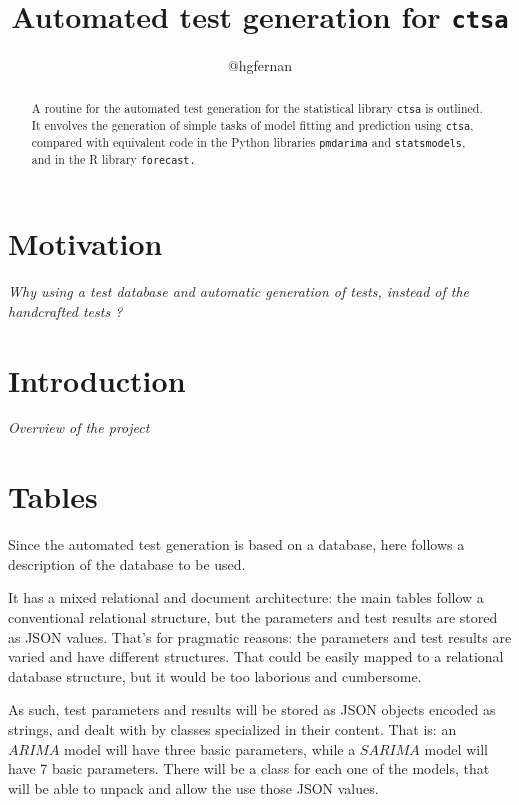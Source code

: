 \documentclass[a4paper,10pt]{article}
\title{Automated test generation for {\tt ctsa}}
\author{@hgfernan}
\begin{document}
\maketitle

\tableofcontents

\begin{abstract}
A routine for the automated test generation for the statistical
library {\tt ctsa} is outlined. It envolves the generation of
simple tasks of model fitting and prediction using {\tt ctsa},
compared with equivalent code in the Python libraries
{\tt pmdarima} and {\tt statsmodels}, and in the R library
{\tt forecast.}
\end{abstract}

\section{Motivation}
\label{sec:motiv}

{\em Why using a test database and automatic generation of
tests, instead of the handcrafted tests ?}

\section{Introduction}
\label{sec:intro}

{\em Overview of the project}

\section{Tables}
\label{sec:tables}

Since the automated test generation is based on a database, here
follows a description of the database to be used.

It has a mixed relational and document architecture: the main
tables follow a conventional relational structure, but the
parameters and test results are stored as JSON values. That's for
pragmatic reasons: the parameters and test results are varied and
have different structures. That could be easily mapped to a
relational database structure, but it would be too laborious and
cumbersome.

As such, test parameters and results will be stored as JSON
objects encoded as strings, and dealt with by classes specialized
in their content. That is:  an $ARIMA$ model will have three basic
parameters, while a $SARIMA$ model will have 7 basic parameters.
There will be a class for each one of the models, that will be
able to unpack and allow the use those JSON values.
\end{document}
